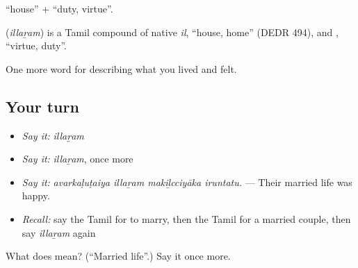  \textquotedblleft{}house\textquotedblright{} +  \textquotedblleft{}duty, virtue\textquotedblright{}.

\begin{cousinweb}
\textbf{} (\emph{illaṟam}) is a Tamil compound of native  \emph{il}, \textquotedblleft{}house, home\textquotedblright{} (DEDR 494), and , \textquotedblleft{}virtue, duty\textquotedblright{}.
\end{cousinweb}

\begin{grammarlens}[title={What you've built}]
One more word for describing what you lived and felt.
\end{grammarlens}

\subsection*{Your turn}
\begin{itemize}
\raggedright
  \item \emph{Say it:} \emph{illaṟam}
  \item \emph{Say it:} \emph{illaṟam}, once more
  \item \emph{Say it:} \emph{avarkaḷuṭaiya illaṟam makiḻcciyāka iruntatu.} — Their married life was happy.
  \item \emph{Recall:} say the Tamil for to marry, then the Tamil for a married couple, then say \emph{illaṟam} again
\end{itemize}

\begin{tcolorbox}[breakable,colback=teal!4,colframe=teal!35!black,title={Before you move on}]
What does  mean? (\textquotedblleft{}Married life\textquotedblright{}.) Say it once more.
\end{tcolorbox}
